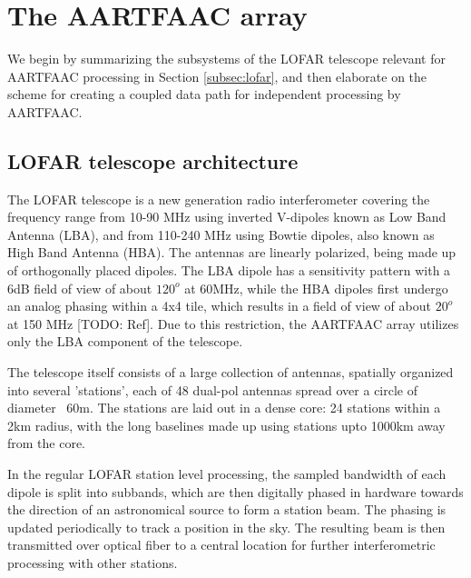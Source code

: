 \documentclass{ws-jai}
\begin{document}
\section {\label{sec:aartfaac_array}The AARTFAAC array}
We  begin by  summarizing the  subsystems of  the LOFAR  telescope relevant  for
AARTFAAC processing in  Section \ref{subsec:lofar}, and then  elaborate on the
scheme for creating a coupled data path for independent processing by AARTFAAC.

\subsection {\label{subsec:lofar} LOFAR telescope architecture}
The   LOFAR   telescope  \citep{van2013lofar}   is   a   new  generation   radio
interferometer  covering  the frequency  range  from  10-90 MHz  using  inverted
V-dipoles known  as Low Band  Antenna (LBA), and  from 110-240 MHz  using Bowtie
dipoles,  also known  as High  Band Antenna  (HBA).  The  antennas are  linearly
polarized, being made  up of orthogonally placed dipoles.  The  LBA dipole has a
sensitivity pattern with  a 6dB field of  view of about $120^o$  at 60MHz, while
the HBA dipoles first undergo an analog phasing within a 4x4 tile, which results
in  a field  of view  of  about $20^o$  at 150  MHz  [TODO: Ref].   Due to  this
restriction,  the  AARTFAAC  array  utilizes  only  the  LBA  component  of  the
telescope.

The  telescope itself  consists of  a  large collection  of antennas,  spatially
organized into  several 'stations', each of  48 dual-pol antennas spread  over a
circle of diameter ~60m.  The stations are laid out in a dense core: 24 stations
within a 2km radius, with the long  baselines made up using stations upto 1000km
away from the core.

In the  regular LOFAR station  level processing,  the sampled bandwidth  of each
dipole  is split  into subbands,  which are  then digitally  phased in  hardware
towards the  direction of  an astronomical  source to form  a station  beam. The
phasing is  updated periodically to track  a position in the  sky. The resulting
beam is  then transmitted over optical  fiber to a central  location for further
interferometric processing with other stations.
\end{document}
